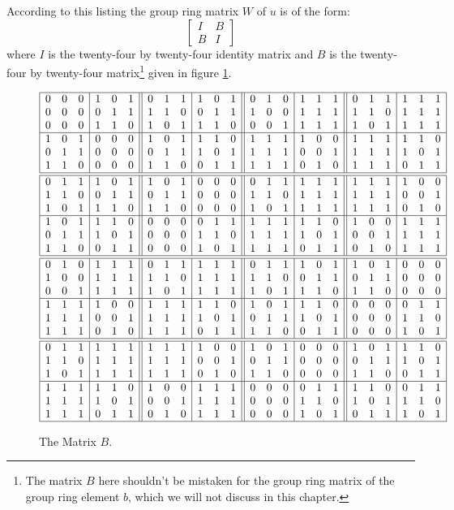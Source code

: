 According to this listing the group ring matrix $W$ of $u$ is of the form:
\[   \left[   \begin{array}{c|c}
I & B \\
\hline
B & I
\end{array}   \right]   \]
where $I$ is the twenty-four by twenty-four identity matrix and $B$ is the twenty-four by twenty-four matrix\footnote{The matrix $B$ here shouldn't be mistaken for the group ring matrix of the group ring element $b$, which we will not discuss in this chapter.} given in figure \ref{fig:fortyeightmatrixB}.
\begin{figure}
\begin{center}
	$
	\begin{array}{|ccc|ccc||ccc|ccc||ccc|ccc||ccc|ccc|}
	\hline
	0&0&0&1&0&1&0&1&1&1&0&1&0&1&0&1&1&1&0&1&1&1&1&1\\
	0&0&0&0&1&1&1&1&0&0&1&1&1&0&0&1&1&1&1&1&0&1&1&1\\
	0&0&0&1&1&0&1&0&1&1&1&0&0&0&1&1&1&1&1&0&1&1&1&1\\
	\hline
	1&0&1&0&0&0&1&0&1&1&1&0&1&1&1&1&0&0&1&1&1&1&1&0\\
	0&1&1&0&0&0&0&1&1&1&0&1&1&1&1&0&0&1&1&1&1&1&0&1\\
	1&1&0&0&0&0&1&1&0&0&1&1&1&1&1&0&1&0&1&1&1&0&1&1\\
	\hline
	\hline
	0&1&1&1&0&1&1&0&1&0&0&0&0&1&1&1&1&1&1&1&1&1&0&0\\
	1&1&0&0&1&1&0&1&1&0&0&0&1&1&0&1&1&1&1&1&1&0&0&1\\
	1&0&1&1&1&0&1&1&0&0&0&0&1&0&1&1&1&1&1&1&1&0&1&0\\
	\hline
	1&0&1&1&1&0&0&0&0&0&1&1&1&1&1&1&1&0&1&0&0&1&1&1\\
	0&1&1&1&0&1&0&0&0&1&1&0&1&1&1&1&0&1&0&0&1&1&1&1\\
	1&1&0&0&1&1&0&0&0&1&0&1&1&1&1&0&1&1&0&1&0&1&1&1\\
	\hline
	\hline
	0&1&0&1&1&1&0&1&1&1&1&1&0&1&1&1&0&1&1&0&1&0&0&0\\
	1&0&0&1&1&1&1&1&0&1&1&1&1&1&0&0&1&1&0&1&1&0&0&0\\
	0&0&1&1&1&1&1&0&1&1&1&1&1&0&1&1&1&0&1&1&0&0&0&0\\
	\hline
	1&1&1&1&0&0&1&1&1&1&1&0&1&0&1&1&1&0&0&0&0&0&1&1\\
	1&1&1&0&0&1&1&1&1&1&0&1&0&1&1&1&0&1&0&0&0&1&1&0\\
	1&1&1&0&1&0&1&1&1&0&1&1&1&1&0&0&1&1&0&0&0&1&0&1\\
	\hline
	\hline
	0&1&1&1&1&1&1&1&1&1&0&0&1&0&1&0&0&0&1&0&1&1&1&0\\
	1&1&0&1&1&1&1&1&1&0&0&1&0&1&1&0&0&0&0&1&1&1&0&1\\
	1&0&1&1&1&1&1&1&1&0&1&0&1&1&0&0&0&0&1&1&0&0&1&1\\
	\hline
	1&1&1&1&1&0&1&0&0&1&1&1&0&0&0&0&1&1&1&1&0&0&1&1\\
	1&1&1&1&0&1&0&0&1&1&1&1&0&0&0&1&1&0&1&0&1&1&1&0\\
	1&1&1&0&1&1&0&1&0&1&1&1&0&0&0&1&0&1&0&1&1&1&0&1\\
	\hline
	\end{array}
	$
\end{center}
\caption{The Matrix $B$.}
\label{fig:fortyeightmatrixB}
\end{figure}
